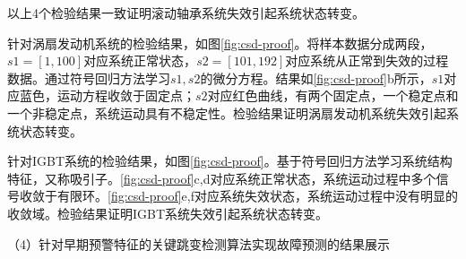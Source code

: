 以上4个检验结果一致证明滚动轴承系统失效引起系统状态转变。

针对涡扇发动机系统的检验结果，如图\ref{fig:csd-proof}。将样本数据分成两段，$s1=[1,100]$对应系统正常状态，$s2=[101,192]	$对应系统从正常到失效的过程数据。通过符号回归方法学习$s1, s2$的微分方程。结果如\ref{fig:csd-proof}b所示，$s1$对应蓝色，运动方程收敛于固定点；$s2$对应红色曲线，有两个固定点，一个稳定点和一个非稳定点，系统运动具有不稳定性。检验结果证明涡扇发动机系统失效引起系统状态转变。

针对IGBT系统的检验结果，如图\ref{fig:csd-proof}。基于符号回归方法学习系统结构特征，又称吸引子。\ref{fig:csd-proof}c,d对应系统正常状态，系统运动过程中多个信号收敛于有限环。\ref{fig:csd-proof}e,f对应系统失效状态，系统运动过程中没有明显的收敛域。检验结果证明IGBT系统失效引起系统状态转变。


（4）针对早期预警特征的关键跳变检测算法实现故障预测的结果展示

